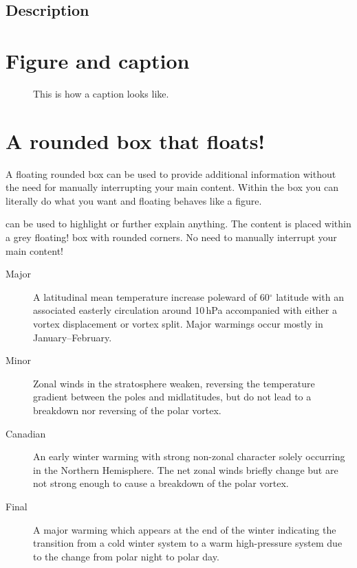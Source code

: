 \blindenumerate[3]

%
% 
\subsection{Description}

\blinddescription[3]

%
% 
\section{Figure and caption}

\blindtext[2]

\begin{figure}[t]
\centering{
%
}
\caption{This is how a caption looks like.}
\label{fig:introduction}
\end{figure} 

\blindtext[1]


%
% 
\section{A rounded box that floats!}
%

A floating rounded box can be used to provide additional information without the need for manually interrupting your main content. Within the box you can literally do what you want and floating behaves like a figure.


\begin{roundedbox}[b]
%
 can be used to highlight or further explain anything. The content is placed within a grey floating! box with rounded corners. No need to manually interrupt your main content!
%
\smallskip
%
\begin{description}
\item [Major] A latitudinal mean temperature increase poleward of 60$^{\circ}$ latitude with an associated easterly circulation around 10\,hPa accompanied with either a vortex displacement or vortex split. Major warmings occur mostly in January--February.
\item [Minor] Zonal winds in the stratosphere weaken, reversing the temperature gradient between the poles and midlatitudes, but do not lead to a breakdown nor reversing of the polar vortex.
\item [Canadian] An early winter warming with strong non-zonal character solely occurring in the Northern Hemisphere. The net zonal winds briefly change but are not strong enough to cause a breakdown of the polar vortex.
\item [Final] A major warming which appears at the end of the winter indicating the transition from a cold winter system to a warm high-pressure system due to the change from polar night to polar day.
\end{description}
%
\end{roundedbox}


